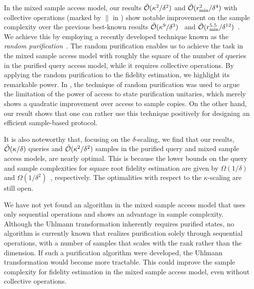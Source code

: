 In the mixed sample access model, our results $\tilde{{\mathcal{O}}}(\kappa^2/\delta^2)$ and $\tilde{{\mathcal{O}}}(r_{\rm min}^2/\delta^4)$ with collective operations (marked by $\|$ in ) show notable improvement on the sample complexity over the previous best-known results $\tilde{{\mathcal{O}}}(\kappa^9/\delta^3)$~\cite{Liu2024geometricmean} and $\tilde{{\mathcal{O}}}(r_{\rm min}^{5.5}/\delta^{12})$~\cite{gilyen2022improvedfidelity}.
We achieve this by employing a recently developed technique known as the \emph{random purification}~\cite{tang2025conjugatequerieshelp}.
The random purification enables us to achieve the task in the mixed sample access model with roughly the square of the number of queries in the purified query access model, while it requires collective operations. 
By applying the random purification to the fidelity estimation, we highlight its remarkable power.
In \cite{tang2025conjugatequerieshelp}, the technique of random purification was used to argue the limitation of the power of access to state purification unitaries, which merely shows a quadratic improvement over access to sample copies.
On the other hand, our result shows that one can rather use this technique positively for designing an efficient sample-based protocol.


It is also noteworthy that, focusing on the $\delta$-scaling, we find that our results, $\tilde{{\mathcal{O}}}(\kappa/\delta)$ queries and $\tilde{{\mathcal{O}}}(\kappa^2/\delta^2)$ samples in the purified query and mixed sample access models, are nearly optimal. This is because the lower bounds on the query and sample complexities for square root fidelity estimation are given by $\Omega(1/\delta)$ and $\Omega(1/\delta^2)$~\cite{Liu2024geometricmean}, respectively.
The optimalities with respect to the $\kappa$-scaling are still open.




We have not yet found an algorithm in the mixed sample access model that uses only sequential operations and shows an advantage in sample complexity. Although the Uhlmann transformation inherently requires purified states, no algorithm is currently known that realizes purification solely through sequential operations, with a number of samples that scales with the rank rather than the dimension.
If such a purification algorithm were developed, the Uhlmann transformation would become more tractable. This could improve the sample complexity for fidelity estimation in the mixed sample access model, even without collective operations.






